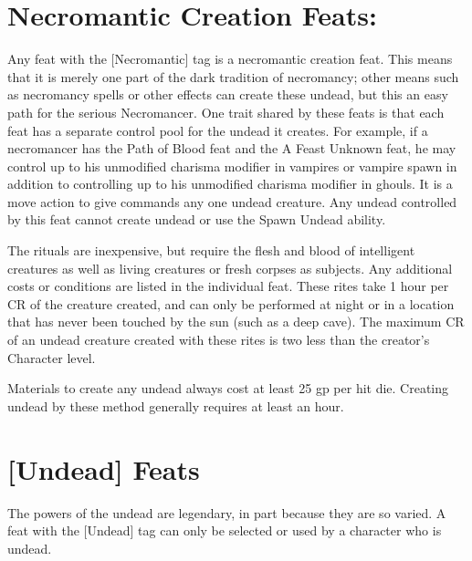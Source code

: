 \section{Necromantic Creation Feats:}

Any feat with the [Necromantic] tag is a necromantic creation feat. This means that it is merely one part of the dark tradition of necromancy; other means such as necromancy spells or other effects can create these undead, but this an easy path for the serious Necromancer. One trait shared by these feats is that each feat has a separate control pool for the undead it creates. For example, if a necromancer has the Path of Blood feat and the A Feast Unknown feat, he may control up to his unmodified charisma modifier in vampires or vampire spawn in addition to controlling up to his unmodified charisma modifier in ghouls. It is a move action to give commands any one undead creature. Any undead controlled by this feat cannot create undead or use the Spawn Undead ability.

The rituals are inexpensive, but require the flesh and blood of intelligent creatures as well as living creatures or fresh corpses as subjects. Any additional costs or conditions are listed in the individual feat. These rites take 1 hour per CR of the creature created, and can only be performed at night or in a location that has never been touched by the sun (such as a deep cave). The maximum CR of an undead creature created with these rites is two less than the creator's Character level.

Materials to create any undead always cost at least 25 gp per hit die. Creating undead by these method generally requires at least an hour.\\

\section{[Undead] Feats}

The powers of the undead are legendary, in part because they are so varied. A feat with the [Undead] tag can only be selected or used by a character who is undead.\\

